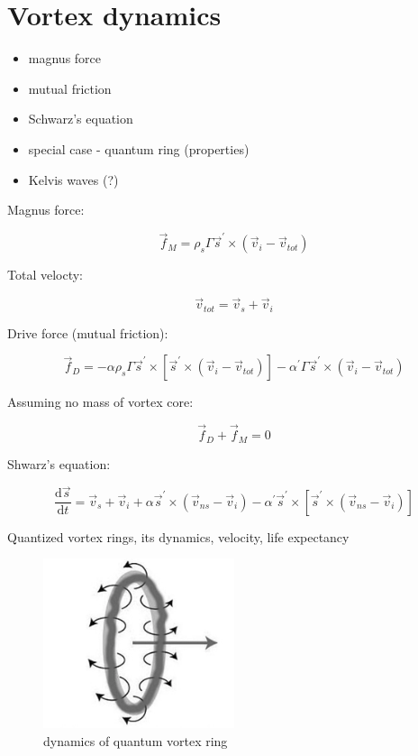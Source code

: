 \section{Vortex dynamics}
\begin{itemize}
	\item magnus force
	\item mutual friction
	\item Schwarz's equation
	\item special case - quantum ring (properties)
	\item Kelvis waves (?)
\end{itemize}

Magnus force:

\begin{equation}
\vec{f}_M = \rho_s \Gamma \vec{s}^{\prime} \times (\vec{v}_i - \vec{v}_{tot})
\end{equation}

Total velocty:

\begin{equation}
\vec{v}_{tot} = \vec{v}_s + \vec{v}_i
\end{equation}


Drive force (mutual friction):

\begin{equation}
\vec{f}_D = - \alpha\rho_s\Gamma\vec{s}^{\prime} \times [\vec{s}^{\prime} \times (\vec{v}_i - \vec{v}_{tot})] - \alpha^{\prime}\Gamma\vec{s}^{\prime} \times (\vec{v}_i - \vec{v}_{tot})
\end{equation}

Assuming no mass of vortex core:

\begin{equation}
\vec{f}_D + \vec{f}_M = 0
\end{equation}

Shwarz's equation:

\begin{equation}
\frac{\text{d}\vec{s}}{\text{d}t} = \vec{v}_s + \vec{v}_i + \alpha\vec{s}^{\prime} \times (\vec{v}_{ns} - \vec{v}_i) - \alpha^{\prime}\vec{s}^{\prime} \times [\vec{s}^{\prime} \times (\vec{v}_{ns} - \vec{v}_i)]
\end{equation}

Quantized vortex rings, its dynamics, velocity, life expectancy

\begin{figure}[h]
	\centering
	\includegraphics[width=0.5\textwidth]{graphics/theory/vortex-ring}
	\caption{dynamics of quantum vortex ring}
	\label{vortex-ring}
\end{figure}

